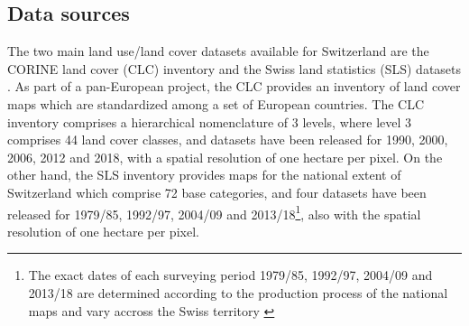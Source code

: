 \documentclass[10pt,letterpaper]{article}
\begin{document}
\subsection*{Data sources}

The two main land use/land cover datasets available for Switzerland are the CORINE land cover (CLC) inventory \cite{heymann1994corine} and the Swiss land statistics (SLS) datasets \cite{sfso2017statistique}.
As part of a pan-European project, the CLC provides an inventory of land cover maps which are standardized among a set of European countries.
The CLC inventory comprises a hierarchical nomenclature of 3 levels, where level 3 comprises 44 land cover classes, and datasets have been released for 1990, 2000, 2006, 2012 and 2018, with a spatial resolution of one hectare per pixel. %
On the other hand, the SLS inventory provides maps for the national extent of Switzerland which comprise 72 base categories, and four datasets have been released for 1979/85, 1992/97, 2004/09 and 2013/18\footnote{\label{fn:sls-years}The exact dates of each surveying period 1979/85, 1992/97, 2004/09 and 2013/18 are determined according to the production process of the national maps and vary accross the Swiss territory \cite{sfso2017statistique}}, also with the spatial resolution of one hectare per pixel.
\end{document}
